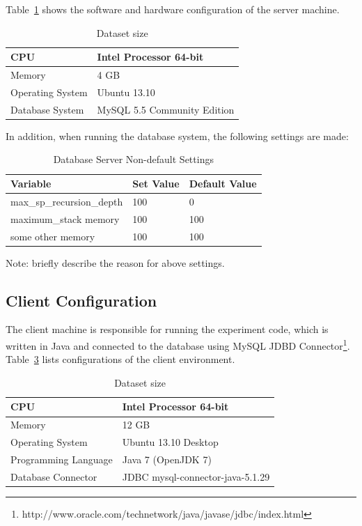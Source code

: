 Table~\ref{table:tbl_server_config} shows the software and hardware configuration of the server machine.

\begin{table}[!h]
  \centering
  \caption{Dataset size\label{table:tbl_server_config}}
  \begin{tabular}{|l|l|}
    \hline
    CPU & Intel Processor 64-bit \\ \hline
    Memory & 4 GB \\ \hline
    Operating System & Ubuntu 13.10 \\ \hline
    Database System & MySQL 5.5 Community Edition \\ \hline 
  \end{tabular}
\end{table}

In addition, when running the database system, the following settings are made:

\begin{table}[!h]
\centering
\caption{Database Server Non-default Settings\label{table:tbl_server_settings}}
\begin{tabular}{|l|l|l|}
\hline
Variable & Set Value & Default Value \\ \hline
max\_sp\_recursion\_depth & 100 & 0 \\ \hline
maximum\_stack memory & 100 & 100 \\ \hline
some other memory & 100 & 100 \\ \hline
\end{tabular}
\end{table}

Note: briefly describe the reason for above settings.

\subsection{Client Configuration}\label{sec-client-config}

The client machine is responsible for running the experiment code, which is written in Java and connected to the database using MySQL JDBD Connector\footnote{http://www.oracle.com/technetwork/java/javase/jdbc/index.html}. Table~\ref{tbl-client-config} lists configurations of the client environment.

\begin{table}[!h]
\centering
\caption{Dataset size\label{tbl-client-config}}
\begin{tabular}{|l|l|}
\hline
CPU & Intel Processor 64-bit \\ \hline
Memory & 12 GB \\ \hline
Operating System & Ubuntu 13.10 Desktop \\ \hline
Programming Language & Java 7 (OpenJDK 7) \\ \hline
Database Connector   & JDBC mysql-connector-java-5.1.29 \\ \hline
\end{tabular}
\end{table}

